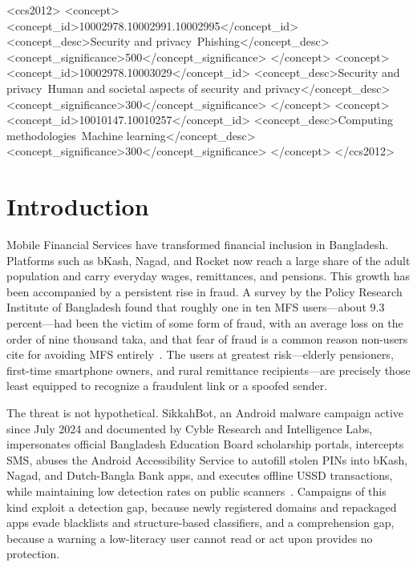 \documentclass[manuscript,screen,review]{acmart}
\begin{document}
\begin{CCSXML}
<ccs2012>
<concept>
<concept_id>10002978.10002991.10002995</concept_id>
<concept_desc>Security and privacy~Phishing</concept_desc>
<concept_significance>500</concept_significance>
</concept>
<concept>
<concept_id>10002978.10003029</concept_id>
<concept_desc>Security and privacy~Human and societal aspects of security and privacy</concept_desc>
<concept_significance>300</concept_significance>
</concept>
<concept>
<concept_id>10010147.10010257</concept_id>
<concept_desc>Computing methodologies~Machine learning</concept_desc>
<concept_significance>300</concept_significance>
</concept>
</ccs2012>
\end{CCSXML}



\maketitle

\section{Introduction}
Mobile Financial Services have transformed financial inclusion in Bangladesh. Platforms such as bKash, Nagad, and Rocket now reach a large share of the adult population and carry everyday wages, remittances, and pensions. This growth has been accompanied by a persistent rise in fraud. A survey by the Policy Research Institute of Bangladesh found that roughly one in ten MFS users---about 9.3 percent---had been the victim of some form of fraud, with an average loss on the order of nine thousand taka, and that fear of fraud is a common reason non-users cite for avoiding MFS entirely~\cite{pri2022}. The users at greatest risk---elderly pensioners, first-time smartphone owners, and rural remittance recipients---are precisely those least equipped to recognize a fraudulent link or a spoofed sender.

The threat is not hypothetical. SikkahBot, an Android malware campaign active since July 2024 and documented by Cyble Research and Intelligence Labs, impersonates official Bangladesh Education Board scholarship portals, intercepts SMS, abuses the Android Accessibility Service to autofill stolen PINs into bKash, Nagad, and Dutch-Bangla Bank apps, and executes offline USSD transactions, while maintaining low detection rates on public scanners~\cite{sikkahbot}. Campaigns of this kind exploit a detection gap, because newly registered domains and repackaged apps evade blacklists and structure-based classifiers, and a comprehension gap, because a warning a low-literacy user cannot read or act upon provides no protection.
\end{document}
